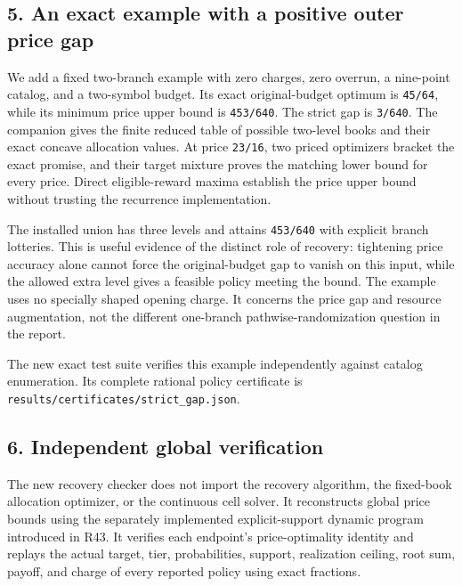 \documentclass[11pt,letterpaper]{article}
\begin{document}
\subsection*{5. An exact example with a positive outer price gap}


We add a fixed two-branch example with zero charges, zero overrun, a nine-point catalog, and a two-symbol budget. Its exact original-budget optimum is \nolinkurl{45/64}, while its minimum price upper bound is \nolinkurl{453/640}. The strict gap is \nolinkurl{3/640}. The companion gives the finite reduced table of possible two-level books and their exact concave allocation values. At price \nolinkurl{23/16}, two priced optimizers bracket the exact promise, and their target mixture proves the matching lower bound for every price. Direct eligible-reward maxima establish the price upper bound without trusting the recurrence implementation.



The installed union has three levels and attains \nolinkurl{453/640} with explicit branch lotteries. This is useful evidence of the distinct role of recovery: tightening price accuracy alone cannot force the original-budget gap to vanish on this input, while the allowed extra level gives a feasible policy meeting the bound. The example uses no specially shaped opening charge. It concerns the price gap and resource augmentation, not the different one-branch pathwise-randomization question in the report.



The new exact test suite verifies this example independently against catalog enumeration. Its complete rational policy certificate is \nolinkurl{results/certificates/strict_gap.json}.



\subsection*{6. Independent global verification}


The new recovery checker does not import the recovery algorithm, the fixed-book allocation optimizer, or the continuous cell solver. It reconstructs global price bounds using the separately implemented explicit-support dynamic program introduced in R43. It verifies each endpoint's price-optimality identity and replays the actual target, tier, probabilities, support, realization ceiling, root sum, payoff, and charge of every reported policy using exact fractions.
\end{document}

